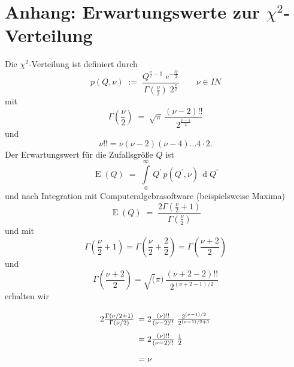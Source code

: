 \section{Anhang: Erwartungswerte zur $\chi^2$-Verteilung}
\label{ErwaChi2}
Die $\chi^2$-Verteilung ist definiert durch
\begin{equation}
p(Q,\nu) \; := \; \frac{ Q^{\frac{\nu}{2}-1} \; e^{-\frac{Q}{2}}}
{\Gamma\left(\frac{\nu}{2}\right) \; 2^{\frac{\nu}{2}}} \qquad \nu \in I \! \! N
\end{equation}
mit
\begin{equation}
\Gamma\left(\frac{\nu}{2}\right) \; = \; \sqrt{\pi} \, \frac{(\nu-2)!!}{2^{\frac{\nu-1}{2}}}
\end{equation}
und
\begin{equation}
\nu!! = \nu (\nu-2) (\nu-4) ... 4 \cdot 2 .
\end{equation}
Der Erwartungswert für die Zufallsgröße $Q$ ist
\begin{equation}
\operatorname{E}(Q) \; = \; \int\limits_{0}^{\infty} \, Q^\prime \, p(Q^\prime,\nu) \,
\operatorname{d}Q^\prime
\end{equation}
und nach Integration mit Computeralgebrasoftware (beispielsweise Maxima)
\begin{equation}
\operatorname{E}(Q) \; = \; \frac{2 \Gamma\left(\frac{\nu}{2} + 1 \right)}{\Gamma\left(\frac{\nu}{2}\right)}
\end{equation}
und mit 
$$
\Gamma\left(\frac{\nu}{2} + 1 \right) = 
\Gamma\left(\frac{\nu}{2} + \frac{2}{2} \right) = \Gamma\left(\frac{\nu+2}{2}\right)
$$
und
$$
\Gamma\left(\frac{\nu+2}{2}\right) = \sqrt(\pi) \, \frac{(\nu+2-2)!!}{2^{(\nu+2-1)/2}}
$$
erhalten wir
\begin{equation}
\arraycolsep=2.4pt\def\arraystretch{2}
\begin{array}{ll}
2 \frac{\Gamma(\nu/2 + 1)}{\Gamma(\nu/2)} 
 & = 2 \frac{(\nu)!!}{(\nu-2)!!} \; \frac{ 2^{(\nu-1)/2} }{ 2^{(\nu-1)/2 + 1}}\\
 & = 2 \frac{(\nu)!!}{(\nu-2)!!} \; \frac{1}{2} \\
 & = \nu
\end{array}
\end{equation}
